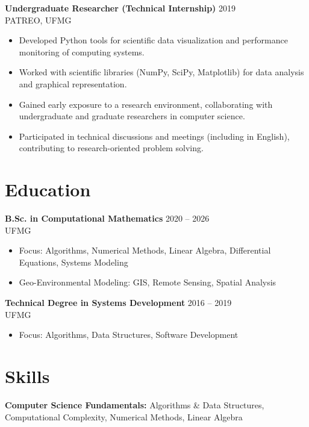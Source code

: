 \documentclass[10pt]{article}
\begin{document}
\noindent\textbf{Undergraduate Researcher (Technical Internship)} \hfill 2019 \\
PATREO, UFMG
\begin{itemize}
    \item Developed Python tools for scientific data visualization and performance monitoring of computing systems.
    \item Worked with scientific libraries (NumPy, SciPy, Matplotlib) for data analysis and graphical representation.
    \item Gained early exposure to a research environment, collaborating with undergraduate and graduate researchers in computer science.
    \item Participated in technical discussions and meetings (including in English), contributing to research-oriented problem solving.
\end{itemize}

\section*{Education}
\noindent\textbf{B.Sc. in Computational Mathematics} \hfill 2020 -- 2026 \\
UFMG
\begin{itemize}
    \item Focus: Algorithms, Numerical Methods, Linear Algebra, Differential Equations, Systems Modeling
    \item Geo-Environmental Modeling: GIS, Remote Sensing, Spatial Analysis
\end{itemize}

\noindent\textbf{Technical Degree in Systems Development} \hfill 2016 -- 2019 \\
UFMG
\begin{itemize}
    \item Focus: Algorithms, Data Structures, Software Development
\end{itemize}

\section*{Skills}


\noindent\textbf{Computer Science Fundamentals:} 
Algorithms \& Data Structures, Computational Complexity, Numerical Methods, Linear Algebra \\
\end{document}
